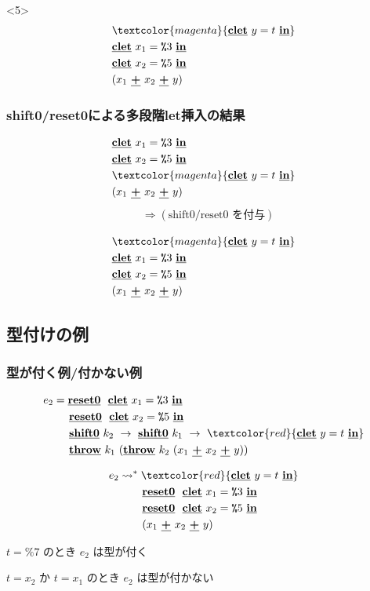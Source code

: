\documentclass[dvipdfmx,cjk,xcolor=dvipsnames,envcountsect,notheorems,12pt]{beamer}
\newcommand\cResetz{\underline{\textbf{reset0}}}
\newcommand\cShiftz{\underline{\textbf{shift0}}}
\newcommand\cThrow{\underline{\textbf{throw}}}
\newcommand\cPlus{\underline{\textbf{+}}}
\newcommand\cLet{\underline{\textbf{clet}}}
\newcommand\cIn{\underline{\textbf{in}}}
\newcommand\csp[1]{\texttt{\%}{#1}}
\newcommand\too{\leadsto^*}
\newcommand\red[1]{\textcolor{red}{#1}}
\newcommand\magenta[1]{\textcolor{magenta}{#1}}
\theoremstyle{definition}
\begin{document}
\begin{frame}
  \begin{onlyenv}<5>
    \begin{align*}
      & \magenta{\cLet~y=t~\cIn} \\
      & \cLet~x_1=\csp{3}~\cIn \\
      & \cLet~x_2=\csp{5}~\cIn \\
      & (x_1~\cPlus~x_2~\cPlus~y)
    \end{align*}
  \end{onlyenv}
\end{frame}

\begin{frame}
  \frametitle{shift0/reset0による多段階let挿入の結果}
  \begin{align*}
    & \cLet~x_1=\csp{3}~\cIn \\
    & \cLet~x_2=\csp{5}~\cIn \\
    & \magenta{\cLet~y=t~\cIn} \\
    & (x_1~\cPlus~x_2~\cPlus~y)
  \end{align*}
  \pause
  \begin{align*}
    & \Rightarrow (\text{shift0/reset0 を付与})\\
  \end{align*}
  \pause
  \begin{align*}
    & \magenta{\cLet~y=t~\cIn} \\
    & \cLet~x_1=\csp{3}~\cIn \\
    & \cLet~x_2=\csp{5}~\cIn \\
    & (x_1~\cPlus~x_2~\cPlus~y)
  \end{align*}
\end{frame}

\subsection{型付けの例}

\begin{frame}
  \frametitle{型が付く例/付かない例}
  \begin{align*}
    e_2 & = \cResetz ~~\cLet~x_1=\csp{3}~\cIn \\
        & \phantom{=}~~ \cResetz ~~\cLet~x_2=\csp{5}~\cIn \\
        & \phantom{=}~~ \cShiftz~k_2~\to~ \cShiftz~k_1~\to~ \red{\cLet~y=t~\cIn} \\
        & \phantom{=}~~ \cThrow~k_1~(\cThrow~k_2~(x_1~\cPlus~x_2~\cPlus~y))
  \end{align*}

  \pause

  \begin{align*}
    e_2 & \too \red{\cLet~y=t~\cIn} \\
        & \phantom{\too}~~ \cResetz ~~\cLet~x_1=\csp{3}~\cIn \\
        & \phantom{\too}~~ \cResetz ~~\cLet~x_2=\csp{5}~\cIn \\
        & \phantom{\too}~~ (x_1~\cPlus~x_2~\cPlus~y)
  \end{align*}

  \pause
  $t=\csp{7}$ のとき $e_2$ は型が付く

  $t=x_2$ か $t=x_1$ のとき $e_2$ は型が付かない
\end{frame}
\end{document}
